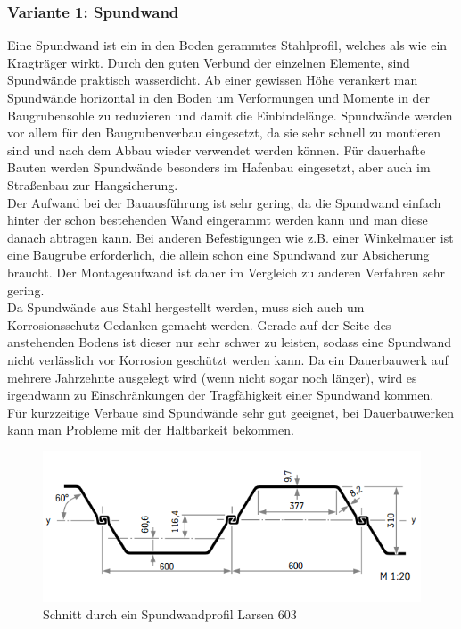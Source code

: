 \documentclass[11pt,fleqn,a4paper]{article}
\begin{document}
\subsubsection*{Variante 1: Spundwand} 
Eine Spundwand ist ein in den Boden gerammtes Stahlprofil, welches als wie ein Kragträger wirkt. Durch den guten Verbund der einzelnen Elemente, sind Spundwände praktisch wasserdicht. Ab einer gewissen Höhe verankert man Spundwände horizontal in den Boden um Verformungen und Momente in der Baugrubensohle zu reduzieren und damit die Einbindelänge. Spundwände werden vor allem für den Baugrubenverbau eingesetzt, da sie sehr schnell zu montieren sind und nach dem Abbau wieder verwendet werden können. Für dauerhafte Bauten werden Spundwände besonders im Hafenbau eingesetzt, aber auch im Straßenbau zur Hangsicherung. \\
Der Aufwand bei der Bauausführung ist sehr gering, da die Spundwand einfach hinter der schon bestehenden Wand eingerammt werden kann und man diese danach abtragen kann. Bei anderen Befestigungen wie z.B. einer Winkelmauer ist eine Baugrube erforderlich, die allein schon eine Spundwand zur Absicherung braucht. Der Montageaufwand ist daher im Vergleich zu anderen Verfahren sehr gering. \\
Da Spundwände aus Stahl hergestellt werden, muss sich auch um Korrosionsschutz Gedanken gemacht werden. Gerade auf der Seite des anstehenden Bodens ist dieser nur sehr schwer zu leisten, sodass eine Spundwand nicht verlässlich vor Korrosion geschützt werden kann. Da ein Dauerbauwerk auf mehrere Jahrzehnte ausgelegt wird (wenn nicht sogar noch länger), wird es irgendwann zu Einschränkungen der Tragfähigkeit einer Spundwand kommen. \\
Für kurzzeitige Verbaue sind Spundwände sehr gut geeignet, bei Dauerbauwerken kann man Probleme mit der Haltbarkeit bekommen.
\newpage
\begin{figure}[h]
\includegraphics[scale=0.5]{Spundwandschnitt.png}
\caption{Schnitt durch ein Spundwandprofil Larsen 603 \cite[2.1.1 S.10]{spund}}
\end{figure}
\end{document}

